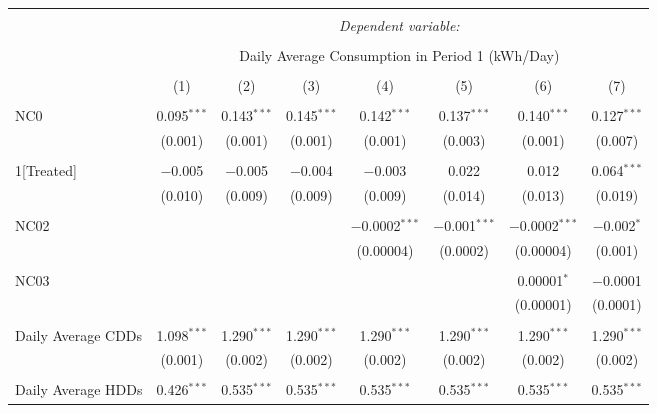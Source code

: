 
\begin{table}[!htbp] \centering 
  \caption{} 
  \label{} 
\small 
\begin{tabular}{@{\extracolsep{5pt}}lccccccc} 
\\[-1.8ex]\hline 
\hline \\[-1.8ex] 
 & \multicolumn{7}{c}{\textit{Dependent variable:}} \\ 
\cline{2-8} 
\\[-1.8ex] & \multicolumn{7}{c}{Daily Average Consumption in Period 1 (kWh/Day)} \\ 
\\[-1.8ex] & (1) & (2) & (3) & (4) & (5) & (6) & (7)\\ 
\hline \\[-1.8ex] 
 NC0 & 0.095$^{***}$ & 0.143$^{***}$ & 0.145$^{***}$ & 0.142$^{***}$ & 0.137$^{***}$ & 0.140$^{***}$ & 0.127$^{***}$ \\ 
  & (0.001) & (0.001) & (0.001) & (0.001) & (0.003) & (0.001) & (0.007) \\ 
  & & & & & & & \\ 
 1[Treated] & $-$0.005 & $-$0.005 & $-$0.004 & $-$0.003 & 0.022 & 0.012 & 0.064$^{***}$ \\ 
  & (0.010) & (0.009) & (0.009) & (0.009) & (0.014) & (0.013) & (0.019) \\ 
  & & & & & & & \\ 
 NC02 &  &  &  & $-$0.0002$^{***}$ & $-$0.001$^{***}$ & $-$0.0002$^{***}$ & $-$0.002$^{*}$ \\ 
  &  &  &  & (0.00004) & (0.0002) & (0.00004) & (0.001) \\ 
  & & & & & & & \\ 
 NC03 &  &  &  &  &  & 0.00001$^{*}$ & $-$0.0001 \\ 
  &  &  &  &  &  & (0.00001) & (0.0001) \\ 
  & & & & & & & \\ 
 Daily Average CDDs & 1.098$^{***}$ & 1.290$^{***}$ & 1.290$^{***}$ & 1.290$^{***}$ & 1.290$^{***}$ & 1.290$^{***}$ & 1.290$^{***}$ \\ 
  & (0.001) & (0.002) & (0.002) & (0.002) & (0.002) & (0.002) & (0.002) \\ 
  & & & & & & & \\ 
 Daily Average HDDs & 0.426$^{***}$ & 0.535$^{***}$ & 0.535$^{***}$ & 0.535$^{***}$ & 0.535$^{***}$ & 0.535$^{***}$ & 0.535$^{***}$ \\ 

\end{tabular}
\end{table}
